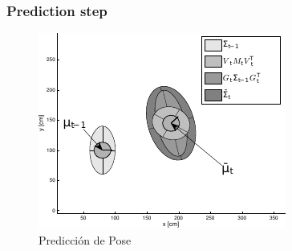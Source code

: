 \begin{frame}
	\frametitle{Prediction step}
	
	\begin{figure}[!h]
		\includegraphics[width=0.5\columnwidth]{./images/ekf_prediction_step.pdf}
        \caption{Predicción de Pose}
	\end{figure}
	
\end{frame}

